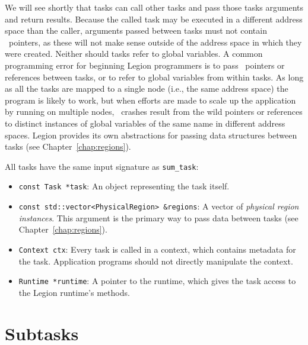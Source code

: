 We will see shortly that tasks can call other tasks and pass
those tasks arguments and return results.  Because the called task may
be executed in a different address space than the caller, arguments
passed between tasks must not contain \Cpp\ pointers, as these will
not make sense outside of the address space in which they were
created.  Neither should tasks refer to global variables. A common
programming error for beginning Legion programmers is to pass
\Cpp\ pointers or references between tasks, or to refer to global
variables from within tasks.  As long as all the tasks are mapped to a
single node (i.e., the same address space) the program is likely to
work, but when efforts are made to scale up the application by running
on multiple nodes, \Cpp\ crashes result from the wild pointers or
references to distinct instances of global variables of the same name
in different address spaces.  Legion provides its own abstractions for
passing data structures between tasks (see
Chapter~\ref{chap:regions}).

All tasks have the same input signature as {\tt sum\_task}:
\begin{itemize}

\item {\tt const Task *task}: An object representing the task itself. 

\item {\tt const std::vector<PhysicalRegion> \&regions}: A vector of {\em physical region instances}.  This argument is the
primary way to pass data between tasks (see Chapter~\ref{chap:regions}).

\item {\tt Context ctx}: Every task is called in a context, which contains metadata for the task.  Application programs
should not directly manipulate the context.

\item {\tt Runtime *runtime}: A pointer to the runtime, which gives the task access to the Legion runtime's methods.

\end{itemize}

\section{Subtasks}
\label{sec:subtasks}


\begin{figure}
  {\small
    
    }
\caption{}
\label{fig:subtask}
\end{figure}



